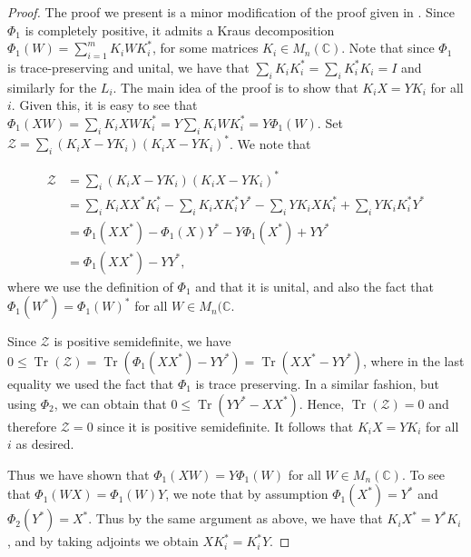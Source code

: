 \documentclass[a4paper,onecolumn,11pt,accepted=2026-01-06]{quantumarticle}
\theoremstyle{plain}
\theoremstyle{remark}
\theoremstyle{definition}
\DeclareMathOperator{\tr}{Tr}
\begin{document}
\begin{proof}
    The proof we present is a minor modification of the proof given in \cite[lemma 4.10]{david_mathprog}. Since $\Phi_1$ is completely positive, it admits a Kraus decomposition $\Phi_1(W) = \sum_{i=1}^m K_i W K_i^{*}$, for some matrices $K_i \in M_n(\mathbb{C})$. Note that since $\Phi_1$ is trace-preserving and unital, we have that $\sum_{i}K_iK_i^* = \sum_{i}K_i^*K_i = I$ and similarly for the $L_i$. The main idea of the proof is to show that $K_i X = YK_i$ for all $i$. Given this, it is easy to see that $\Phi_1(XW) = \sum_{i}K_i XW K_i^* = Y \sum_{i}K_iW K_i^* = Y \Phi_1(W)$. Set $\mathcal{Z} = \sum_{i} (K_i X - YK_i)(K_iX - YK_i)^*$. We note that 

    \begin{align*}
        \mathcal{Z} & = \sum_{i} (K_i X - YK_i)(K_iX - YK_i)^* \\
        & = \sum_i K_i XX^* K_i^* - \sum_i K_i X K_i^* Y^* - \sum_i Y K_i X K_i^* + \sum_i Y K_iK_i^* Y^* \\
        & = \Phi_1(XX^*) - \Phi_1(X)Y^* - Y \Phi_1(X^*) + YY^* \\
        & = \Phi_1(XX^*) - YY^*, 
    \end{align*}
    where we use the definition of $\Phi_1$ and that it is unital, and also the fact that $\Phi_1(W^*) = \Phi_1(W)^*$ for all $W \in M_n(\mathbb{C}$. 
    
    Since $\mathcal{Z}$ is positive semidefinite, we have $0 \leq \tr(\mathcal{Z}) = \tr(\Phi_1(XX^*) - YY^*) = \tr(XX^* - YY^*)$, where in the last equality we used the fact that $\Phi_1$ is trace preserving. In a similar fashion, but using $\Phi_2$, %
    we can obtain that $0 \le \tr(YY^* - XX^*)$. Hence, $\tr(\mathcal{Z}) = 0$ and therefore $\mathcal{Z} = 0$ since it is positive semidefinite. It follows that $K_iX = YK_i$ for all $i$ as desired.

    Thus we have shown that $\Phi_1(XW) = Y\Phi_1(W)$ for all $W \in M_n(\mathbb{C})$. To see that $\Phi_1(WX) = \Phi_1(W)Y$, we note that by assumption $\Phi_1(X^*) = Y^*$ and $\Phi_2(Y^*) = X^*$. Thus by the same argument as above, we have that $K_iX^* = Y^*K_i$, and by taking adjoints we obtain $XK_i^* = K_i^*Y$.
    


\end{proof}
\end{document}
